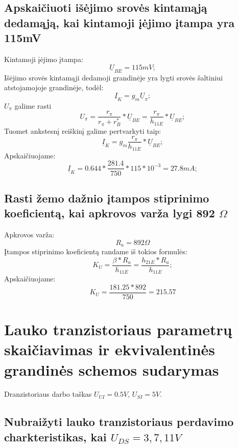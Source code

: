 \documentclass[11pt,a4paper]{article}
\begin{document}
\subsection{Apskaičiuoti išėjimo srovės kintamąją dedamąją, kai kintamoji įėjimo įtampa yra 115mV}
Kintamoji įėjimo įtampa:
\[
\underline{U}_{BE} = 115mV;
\]
Išėjimo srovės kintamąji dedamoji grandinėje yra lygti srovės šaltiniui atstojamojoje grandinėje, todėl:
\begin{equation}
	\underline{I}_{K} = g_m \underline{U}_{\pi};
\end{equation}
$U_{\pi}$ galime rasti
\begin{equation}
	U_{\pi} = \frac{r_{\pi}}{r_{\pi}+r_{B}^*} * \underline{U}_{BE} = \frac{r_{\pi}}{h_{11E}} * \underline{U}_{BE};
\end{equation}
Tuomet ankstesnį reiškinį galime pertvarkyti taip:
\[
	\underline{I}_{K} = g_m \frac{r_{\pi}}{h_{11E}} * \underline{U}_{BE};
\]
Apskaičiuojame:
\[
	\underline{I}_{K} = 0.644 * \frac{281.4}{750} * 115*10^{-3} = 27.8 mA;
\]

\subsection{Rasti žemo dažnio įtampos stiprinimo koeficientą, kai apkrovos varža lygi 892 $\Omega$ }
Apkrovos varža:
\[R_a = 892 \Omega\]
Įtampos stiprinimo koeficientą randame iš tokios formulės:
\begin{equation}
	K_U = \frac{\beta * R_a}{h_{11E}} = \frac{h_{21E} * R_a}{h_{11E}};
\end{equation}
Apskaičiuojame:
\[
	K_U = \frac{ 181.25 * 892 }{750} = 215.57
\]
\section{Lauko tranzistoriaus parametrų skaičiavimas ir ekvivalentinės grandinės schemos sudarymas}

Dranzistoriaus darbo taškas $U_{UI} = 0.5 V$, $U_{SI} = 5 V$.

\subsection{Nubraižyti lauko tranzistoriaus perdavimo charkteristikas, kai $U_{DS} = 3,7,11 V$}
\end{document}
